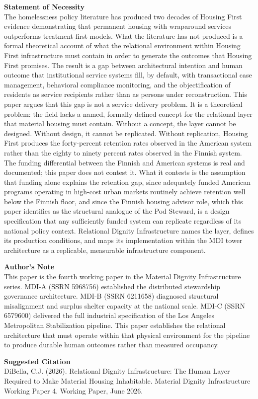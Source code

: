 \documentclass[12pt, letterpaper]{article}
\begin{document}
{\vspace{8pt}
\noindent\textbf{Statement of Necessity}\\[1pt]
The homelessness policy literature has produced two decades of Housing First evidence demonstrating that permanent housing with wraparound services outperforms treatment-first models. What the literature has not produced is a formal theoretical account of what the relational environment within Housing First infrastructure must contain in order to generate the outcomes that Housing First promises. The result is a gap between architectural intention and human outcome that institutional service systems fill, by default, with transactional case management, behavioral compliance monitoring, and the objectification of residents as service recipients rather than as persons under reconstruction. This paper argues that this gap is not a service delivery problem. It is a theoretical problem: the field lacks a named, formally defined concept for the relational layer that material housing must contain. Without a concept, the layer cannot be designed. Without design, it cannot be replicated. Without replication, Housing First produces the forty-percent retention rates observed in the American system rather than the eighty to ninety percent rates observed in the Finnish system. The funding differential between the Finnish and American systems is real and documented; this paper does not contest it. What it contests is the assumption that funding alone explains the retention gap, since adequately funded American programs operating in high-cost urban markets routinely achieve retention well below the Finnish floor, and since the Finnish housing advisor role, which this paper identifies as the structural analogue of the Pod Steward, is a design specification that any sufficiently funded system can replicate regardless of its national policy context. Relational Dignity Infrastructure names the layer, defines its production conditions, and maps its implementation within the MDI tower architecture as a replicable, measurable infrastructure component.

\newpage

\vspace{8pt}
\noindent\textbf{Author's Note}\\[1pt]
This paper is the fourth working paper in the Material Dignity Infrastructure series. MDI-A (SSRN 5968756) established the distributed stewardship governance architecture. MDI-B (SSRN 6211658) diagnosed structural misalignment and surplus shelter capacity at the national scale. MDI-C (SSRN 6579600) delivered the full industrial specification of the Los Angeles Metropolitan Stabilization pipeline. This paper establishes the relational architecture that must operate within that physical environment for the pipeline to produce durable human outcomes rather than measured occupancy.

\vspace{8pt}
\noindent\textbf{Suggested Citation}\\[1pt]
DiBella, C.J. (2026). Relational Dignity Infrastructure: The Human Layer Required to Make Material Housing Inhabitable. Material Dignity Infrastructure Working Paper 4. Working Paper, June 2026.

}
\end{document}

